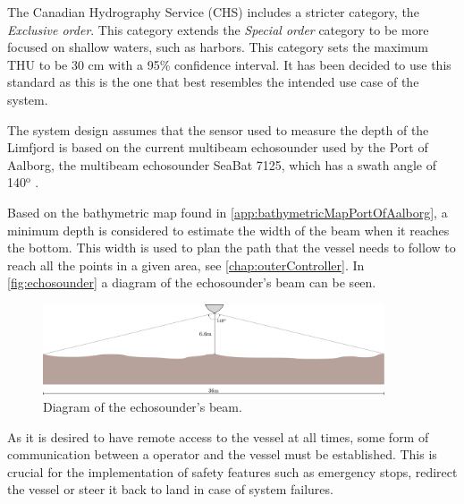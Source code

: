 The Canadian Hydrography Service (CHS) includes a stricter category, the \emph{Exclusive order}. 
This category extends the \emph{Special order} category to be more focused on shallow waters, such as harbors. 
This category sets the maximum THU to be 30 cm with a 95\% confidence interval. 
It has been decided to use this standard as this is the one that best resembles the intended use case of the system. \cite{CHS}

The system design assumes that the sensor used to measure the depth of the Limfjord is based on the current multibeam echosounder used by the Port of Aalborg, the multibeam echosounder SeaBat 7125, which has a swath angle of 140$^\mathrm{o}$ \cite{echoSounder}.

Based on the bathymetric map found in \autoref{app:bathymetricMapPortOfAalborg}, a minimum depth is considered to estimate the width of the beam when it reaches the bottom. This width is used to plan the path that the vessel needs to follow to reach all the points in a given area, see \autoref{chap:outerController}. In \autoref{fig:echosounder} a diagram of the echosounder's beam can be seen.

\begin{figure}[H]
    \includegraphics[width=0.9\textwidth]{figures/echosounder}
    \caption{Diagram of the echosounder's beam.}
    \label{fig:echosounder}
\end{figure}

As it is desired to have remote access to the vessel at all times, some form of communication between a operator and the vessel must be established. This is crucial for the implementation of safety features such as emergency stops, redirect the vessel or steer it back to land in case of system failures.

